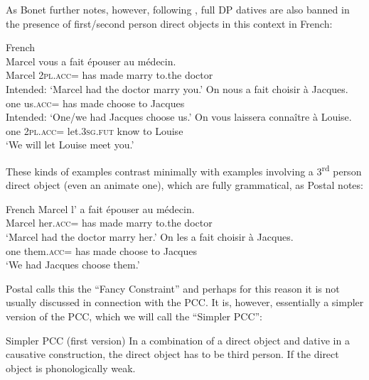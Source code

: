 \documentclass[output=paper,colorlinks,citecolor=brown,nonflat]{langsci/langscibook}
\begin{document}
As Bonet further notes, however, following \citet{Postal1989}, full DP datives are also banned in the presence of first/second person direct objects in this context in French:

\ea%
    \label{ex:sheehan:14}
    French \citep[2]{Postal1989}\\
    \ea\label{ex:sheehan:14a}
    \gll    *Marcel vous   a   fait   épouser   au     médecin.\\
            Marcel   2\textsc{pl}.\textsc{acc}=  has   made   marry   to.the   doctor\\
    \glt    Intended: ‘Marcel had the doctor marry you.’
    \ex\label{ex:sheehan:14b}
    \gll    *On   nous     a   fait     choisir   à Jacques.\\
            one     us.\textsc{acc}= has   made   choose   to Jacques\\
    \glt    Intended: ‘One/we had Jacques choose us.’
    \ex\label{ex:sheehan:14c}
    \gll    *On   vous   laissera   connaître   à Louise.\\
            one   2\textsc{pl}\textsc{.acc}=  let.\textsc{3sg.fut} know     to Louise\\
    \glt    ‘We will let Louise meet you.'
    \z
\z

These kinds of examples contrast minimally with examples involving a 3\textsuperscript{rd} person direct object (even an animate one), which are fully grammatical, as Postal notes:

\ea%
    \label{ex:sheehan:15}
    French \citep[2]{Postal1989}
    \ea\label{ex:sheehan:15a}
    \gll  Marcel   l’       a  fait    épouser   au     médecin.\\
            Marcel   her\textsc{.acc}=  has  made    marry   to.the   doctor\\
    \glt      ‘Marcel had the doctor marry her.’
    \ex\label{ex:sheehan:15b}
    \gll    On   les       a   fait     choisir   à Jacques.\\
            one   them.\textsc{acc}=  has   made   choose   to Jacques\\
    \glt    ‘We had Jacques choose them.’
    \z
\z

Postal calls this the ``Fancy Constraint'' and perhaps for this reason it is not usually discussed in connection with the PCC. It is, however, essentially a simpler version of the PCC, which we will call the ``Simpler PCC'':

\ea%
    \label{ex:sheehan:16}
    Simpler PCC (first version)
    \ea\label{ex:sheehan:16a}
    In a combination of a direct object and dative in a causative construction, the direct object has to be third person.
    \ex\label{ex:sheehan:16b}
    If the direct object is phonologically weak.
    \z
\z
\end{document}
